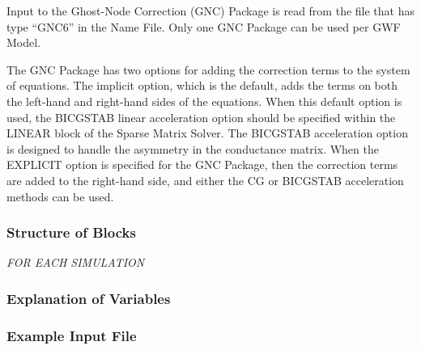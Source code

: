 Input to the Ghost-Node Correction (GNC) Package is read from the file that has type ``GNC6'' in the Name File.  Only one GNC Package can be used per GWF Model.

The GNC Package has two options for adding the correction terms to the system of equations.  The implicit option, which is the default, adds the terms on both the left-hand and right-hand sides of the equations.  When this default option is used, the BICGSTAB linear acceleration option should be specified within the LINEAR block of the Sparse Matrix Solver.  The BICGSTAB acceleration option is designed to handle the asymmetry in the conductance matrix.  When the EXPLICIT option is specified for the GNC Package, then the correction terms are added to the right-hand side, and either the CG or BICGSTAB acceleration methods can be used.

\vspace{5mm}
\subsubsection{Structure of Blocks}
\vspace{5mm}

\noindent \textit{FOR EACH SIMULATION}




\vspace{5mm}
\subsubsection{Explanation of Variables}
\begin{description}

\end{description}

\vspace{5mm}
\subsubsection{Example Input File}

